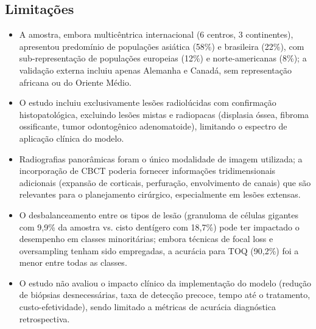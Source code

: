 \subsection{Limitações}
\begin{itemize}
  \item A amostra, embora multicêntrica internacional (6 centros,
        3 continentes), apresentou predomínio de populações asiática
        (58\%) e brasileira (22\%), com sub-representação de
        populações europeias (12\%) e norte-americanas (8\%); a
        validação externa incluiu apenas Alemanha e Canadá, sem
        representação africana ou do Oriente Médio.
  \item O estudo incluiu exclusivamente lesões radiolúcidas com
        confirmação histopatológica, excluindo lesões mistas e
        radiopacas (displasia óssea, fibroma ossificante, tumor
        odontogênico adenomatoide), limitando o espectro de
        aplicação clínica do modelo.
  \item Radiografias panorâmicas foram o único modalidade de imagem
        utilizada; a incorporação de CBCT poderia fornecer informações
        tridimensionais adicionais (expansão de corticais, perfuração,
        envolvimento de canais) que são relevantes para o
        planejamento cirúrgico, especialmente em lesões extensas.
  \item O desbalanceamento entre os tipos de lesão (granuloma de
        células gigantes com 9,9\% da amostra vs. cisto dentígero
        com 18,7\%) pode ter impactado o desempenho em classes
        minoritárias; embora técnicas de focal loss e oversampling
        tenham sido empregadas, a acurácia para TOQ (90,2\%) foi
        a menor entre todas as classes.
  \item O estudo não avaliou o impacto clínico da implementação do
        modelo (redução de biópsias desnecessárias, taxa de detecção
        precoce, tempo até o tratamento, custo-efetividade), sendo
        limitado a métricas de acurácia diagnóstica retrospectiva.
\end{itemize}

